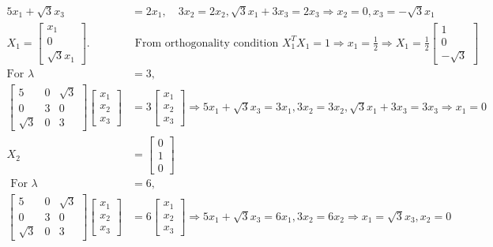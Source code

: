 \begin{enumerate}
\begin{answer}
\begin{align*}
	5 x_{1}+\sqrt{3} x_{3}&=2 x_{1}, \quad 3 x_{2}=2 x_{2}, \sqrt{3} x_{1}+3 x_{3}=2 x_{3} \Rightarrow x_{2}=0, x_{3}=-\sqrt{3} x_{1}\\
	X_{1}=\left[\begin{array}{c}x_{1} \\ 0 \\ \sqrt{3} x_{1}\end{array}\right] .&\text{ From orthogonality condition }X_{1}^{T} X_{1}=1 \Rightarrow x_{1}=\frac{1}{2} \Rightarrow X_{1}=\frac{1}{2}\left[\begin{array}{c}1 \\ 0 \\ -\sqrt{3}\end{array}\right]\\
	\text{For }\lambda&=3,\\
	\left[\begin{array}{ccc}5 & 0 & \sqrt{3} \\ 0 & 3 & 0 \\ \sqrt{3} & 0 & 3\end{array}\right]\left[\begin{array}{l}x_{1} \\ x_{2} \\ x_{3}\end{array}\right]&=3\left[\begin{array}{l}x_{1} \\ x_{2} \\ x_{3}\end{array}\right] \Rightarrow 5 x_{1}+\sqrt{3} x_{3}=3 x_{1}, 3 x_{2}=3 x_{2}, \sqrt{3} x_{1}+3 x_{3}=3 x_{3} \Rightarrow x_{1}=0\\
	X_{2}&=\left[\begin{array}{l}
	0 \\
	1 \\
	0
	\end{array}\right]\\
\text{	For }\lambda&=6,\\
\left[\begin{array}{ccc}5 & 0 & \sqrt{3} \\ 0 & 3 & 0 \\ \sqrt{3} & 0 & 3\end{array}\right]\left[\begin{array}{l}x_{1} \\ x_{2} \\ x_{3}\end{array}\right]&=6\left[\begin{array}{l}x_{1} \\ x_{2} \\ x_{3}\end{array}\right] \Rightarrow 5 x_{1}+\sqrt{3} x_{3}=6 x_{1}, 3 x_{2}=6 x_{2} \Rightarrow x_{1}=\sqrt{3} x_{3}, x_{2}=0\\

\end{align*}
\end{answer}
\end{enumerate}

